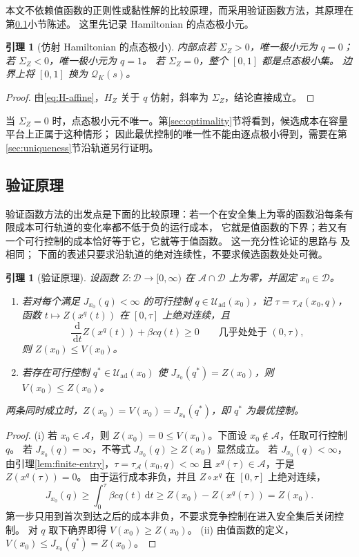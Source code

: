 \documentclass[11pt,a4paper,UTF8]{ctexart}
\newtheorem{lemma}[theorem]{引理}
\theoremstyle{definition}
\newcommand{\Acal}{\mathcal A}
\newcommand{\Dcal}{\mathcal D}
\newcommand{\Uad}{\mathcal U_{\mathrm{ad}}}
\newcommand{\dd}{\,\mathrm d}
\begin{document}
本文不依赖值函数的正则性或黏性解的比较原理，而采用验证函数方法，其原理在第\ref{sec:verification-principle}小节陈述。
这里先记录 Hamiltonian 的点态极小元。

\begin{lemma}[仿射 Hamiltonian 的点态极小]
\label{lem:bangbang}
内部点若 $\Sigma_Z>0$，唯一极小元为 $q=0$；若 $\Sigma_Z<0$，唯一极小元为 $q=1$。
若 $\Sigma_Z=0$，整个 $[0,1]$ 都是点态极小集。
边界上将 $[0,1]$ 换为 $\mathcal Q_K(s)$。
\end{lemma}
\begin{proof}
由\eqref{eq:H-affine}，$H_Z$ 关于 $q$ 仿射，斜率为 $\Sigma_Z$，结论直接成立。
\end{proof}
当 $\Sigma_Z=0$ 时，点态极小元不唯一。第\ref{sec:optimality}节将看到，候选成本在容量平台上正属于这种情形；
因此最优控制的唯一性不能由逐点极小得到，需要在第\ref{sec:uniqueness}节沿轨道另行证明。

\subsection{验证原理}
\label{sec:verification-principle}
验证函数方法的出发点是下面的比较原理：若一个在安全集上为零的函数沿每条有限成本可行轨道的变化率都不低于负的运行成本，
它就是值函数的下界；若又有一个可行控制的成本恰好等于它，它就等于值函数。
这一充分性论证的思路与 \citet[附录A.1]{MicloSpiroWeibull2022} 及 \citet[\S5.1.4]{Liberzon2012} 相同；
下面的表述只要求沿轨道的绝对连续性，不要求候选函数处处可微。

\begin{lemma}[验证原理]
\label{lem:verification-principle}
设函数 $Z:\Dcal\to[0,\infty)$ 在 $\Acal\cap\Dcal$ 上为零，并固定 $x_0\in\Dcal$。
\begin{enumerate}
\item[(i)] 若对每个满足 $J_{x_0}(q)<\infty$ 的可行控制 $q\in\Uad(x_0)$，记 $\tau=\tau_{\Acal}(x_0,q)$，
函数 $t\mapsto Z(x^q(t))$ 在 $[0,\tau]$ 上绝对连续，且
\[
\frac{\dd}{\dd t}Z(x^q(t))+\beta cq(t)\ge0\qquad\text{几乎处处于 }(0,\tau),
\]
则 $Z(x_0)\le V(x_0)$。
\item[(ii)] 若存在可行控制 $q^*\in\Uad(x_0)$ 使 $J_{x_0}(q^*)=Z(x_0)$，则 $V(x_0)\le Z(x_0)$。
\end{enumerate}
两条同时成立时，$Z(x_0)=V(x_0)=J_{x_0}(q^*)$，即 $q^*$ 为最优控制。
\end{lemma}
\begin{proof}
(i) 若 $x_0\in\Acal$，则 $Z(x_0)=0\le V(x_0)$。下面设 $x_0\notin\Acal$，任取可行控制 $q$。
若 $J_{x_0}(q)=\infty$，不等式 $J_{x_0}(q)\ge Z(x_0)$ 显然成立。
若 $J_{x_0}(q)<\infty$，由引理\ref{lem:finite-entry}，$\tau=\tau_{\Acal}(x_0,q)<\infty$ 且 $x^q(\tau)\in\Acal$，于是 $Z(x^q(\tau))=0$。
由于运行成本非负，并且 $Z\circ x^q$ 在 $[0,\tau]$ 上绝对连续，
\[
J_{x_0}(q)\ge\int_0^{\tau}\beta cq(t)\dd t
\ge Z(x_0)-Z(x^q(\tau))=Z(x_0).
\]
第一步只用到首次到达之后的成本非负，不要求竞争控制在进入安全集后关闭控制。
对 $q$ 取下确界即得 $V(x_0)\ge Z(x_0)$。
(ii) 由值函数的定义，$V(x_0)\le J_{x_0}(q^*)=Z(x_0)$。
\end{proof}
\end{document}
